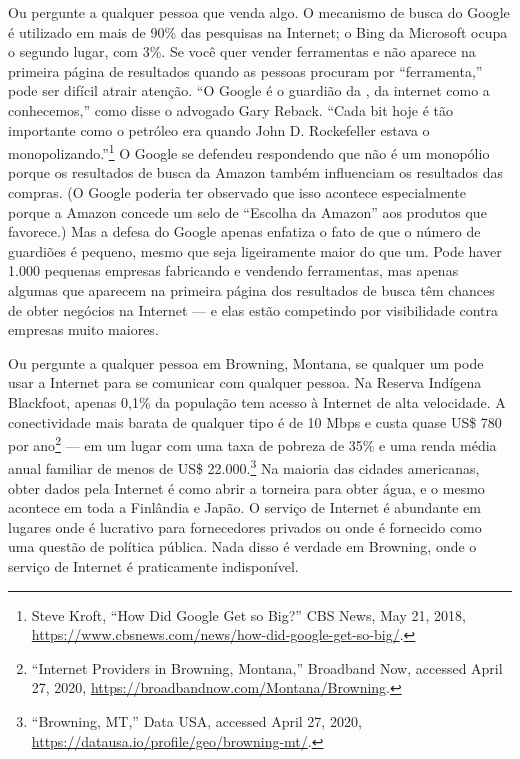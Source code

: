 Ou pergunte a qualquer pessoa que venda algo. O mecanismo de busca do Google é
utilizado em mais de 90\% das pesquisas na Internet; o Bing da Microsoft ocupa o
segundo lugar, com 3\%. Se você quer vender ferramentas e não aparece na primeira
página de resultados quando as pessoas procuram por ``ferramenta,'' pode ser difícil
atrair atenção. ``O Google é o guardião da , da internet como
a conhecemos,'' como disse o advogado Gary Reback. ``Cada bit hoje é tão importante
como o petróleo era quando John D. Rockefeller estava o monopolizando.''\footnote{Steve
Kroft, ``How Did Google Get so Big?'' CBS News, May 21, 2018,
\url{https://www.cbsnews.com/news/how-did-google-get-so-big/}.}
O Google se defendeu respondendo que não é um monopólio porque os resultados de busca
da Amazon também influenciam os resultados das compras. (O Google poderia ter observado
que isso acontece especialmente porque a Amazon concede um selo de ``Escolha da Amazon''
aos produtos que favorece.) Mas a defesa do Google apenas enfatiza o fato de que o
número de guardiões é pequeno, mesmo que seja ligeiramente maior do que um. Pode haver
1.000 pequenas empresas fabricando e vendendo ferramentas, mas apenas algumas que
aparecem na primeira página dos resultados de busca têm chances de obter negócios na
Internet --- e elas estão competindo por visibilidade contra empresas muito maiores.

Ou pergunte a qualquer pessoa em Browning, Montana, se qualquer um pode usar a Internet
para se comunicar com qualquer pessoa. Na Reserva Indígena Blackfoot, apenas 0,1\% da
população tem acesso à Internet de alta velocidade. A conectividade mais barata de
qualquer tipo é de 10 Mbps e custa quase US\$ 780 por ano\footnote{``Internet Providers
in Browning, Montana,'' Broadband Now, accessed April 27, 2020, \url{https://broadbandnow.com/Montana/Browning}.}
--- em um lugar com uma taxa de pobreza de 35\% e uma renda média anual familiar de
menos de US\$ 22.000.\footnote{``Browning, MT,'' Data USA, accessed April 27, 2020,
\url{https://datausa.io/profile/geo/browning-mt/}.} Na maioria das cidades americanas,
obter dados pela Internet é como abrir a torneira para obter água, e o mesmo acontece
em toda a Finlândia e Japão. O serviço de Internet é abundante em lugares onde é
lucrativo para fornecedores privados ou onde é fornecido como uma questão de política
pública. Nada disso é verdade em Browning, onde o serviço de Internet é praticamente
indisponível.

